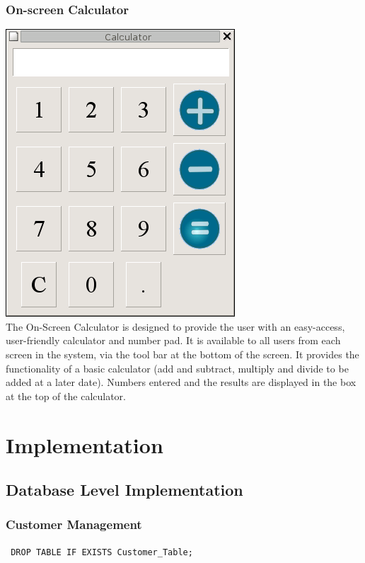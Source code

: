 \documentclass{report}
\begin{document}
\begin{itemize}
    \newpage

    \subsection{On-screen Calculator}
    \includegraphics{ys_calc_screener.png}\\

    The On-Screen Calculator is designed to provide the user with
    an easy-access, user-friendly calculator and number pad.  It
    is available to all users from each screen in the system, via the tool bar
    at the bottom of the screen.  It provides the functionality of
    a basic calculator (add and subtract, multiply and divide to
    be added at a later date).  Numbers entered and the results
    are displayed in the box at the top of the calculator.\\

\chapter{Implementation}

    \section{Database Level Implementation}


        \subsection{Customer Management}
        {\tt\small
        DROP TABLE IF EXISTS Customer\_Table;\\

}
\end{itemize}
\end{document}
